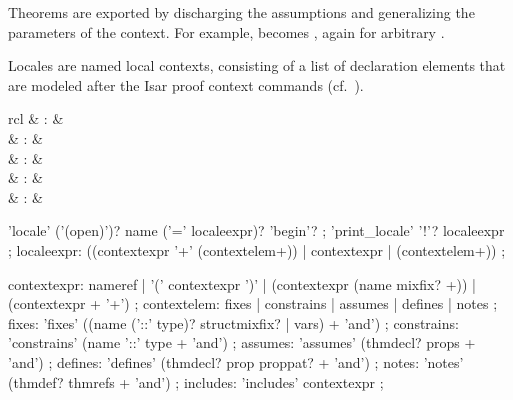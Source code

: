 \begin{isabellebody}
\begin{isamarkuptext}
  Theorems are exported by discharging the assumptions and
  generalizing the parameters of the context.  For example,  becomes , again for arbitrary
  .%
\end{isamarkuptext}%
\isamarkuptrue%
%
\isamarkuptrue%
%
\begin{isamarkuptext}%
Locales are named local contexts, consisting of a list of
  declaration elements that are modeled after the Isar proof context
  commands (cf.\ ).%
\end{isamarkuptext}%
\isamarkuptrue%
%
\isamarkuptrue%
%
\begin{isamarkuptext}%
\begin{matharray}{rcl}
    \mbox{} & : &  \\
    \mbox{}\isa{\isactrlsup {\isacharasterisk}} & : &  \\
    \mbox{}\isa{\isactrlsup {\isacharasterisk}} & : &  \\
    \mbox{} & : & \isarmeth \\
    \mbox{} & : & \isarmeth \\
  \end{matharray}

  \begin{rail}
    'locale' ('(open)')? name ('=' localeexpr)? 'begin'?
    ;
    'print\_locale' '!'? localeexpr
    ;
    localeexpr: ((contextexpr '+' (contextelem+)) | contextexpr | (contextelem+))
    ;

    contextexpr: nameref | '(' contextexpr ')' |
    (contextexpr (name mixfix? +)) | (contextexpr + '+')
    ;
    contextelem: fixes | constrains | assumes | defines | notes
    ;
    fixes: 'fixes' ((name ('::' type)? structmixfix? | vars) + 'and')
    ;
    constrains: 'constrains' (name '::' type + 'and')
    ;
    assumes: 'assumes' (thmdecl? props + 'and')
    ;
    defines: 'defines' (thmdecl? prop proppat? + 'and')
    ;
    notes: 'notes' (thmdef? thmrefs + 'and')
    ;
    includes: 'includes' contextexpr
    ;
  \end{rail}


\end{isamarkuptext}
\end{isabellebody}
